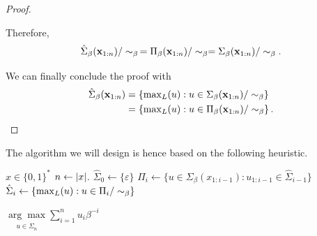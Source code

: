 \begin{proof}
\begin{enumerate}[label=(\alph*)]
        Therefore,
        \begin{equation}
            \hat \Sigma_\beta({\bf x}_{1:n}) / \sim_\beta \, = \Pi_\beta({\bf x}_{1:n}) / \sim_\beta = \Sigma_\beta({\bf x}_{1:n}) / \sim_\beta.
        \end{equation}
    \end{enumerate}
    We can finally conclude the proof with
    \begin{align}
        \hat \Sigma_\beta({\bf x}_{1:n}) &= \left\{ \mathop{\operatorname{max}_L} (u) : u \in \Sigma_\beta({\bf x}_{1:n}) / \sim_\beta\right\}\\
        & = \left\{ \mathop{\operatorname{max}_L} (u) : u \in \Pi_\beta({\bf x}_{1:n}) / \sim_\beta\right\}.
    \end{align}
\end{proof}

The algorithm we will design is hence based on the following heuristic.
\begin{algorithm}[H]
    \caption{Heuristic for computing $M_\beta$}
    \label{alg:Heuristic for computing M beta}
    \begin{algorithmic}[1]
        \Require $x \in \{0,1\}^\ast$
        \State $n \gets \left| x \right|$.
        \State $\hat \Sigma_0 \gets \{\varepsilon\}$
            \State $\Pi_i \gets \{ u \in \Sigma_\beta(x_{1:i-1}) : u_{1:i-1} \in \hat \Sigma_{i-1}\}$
            \State $\hat \Sigma_i \gets \{ \mathop{\operatorname{max}_L}(u) : u \in \Pi_i/ \sim_\beta\}$
        \EndFor
    \end{algorithmic}
    \Return $\underset{u \in \hat \Sigma_n}{\arg\max} \sum_{i=1}^n u_i \beta^{-i}$
\end{algorithm}

